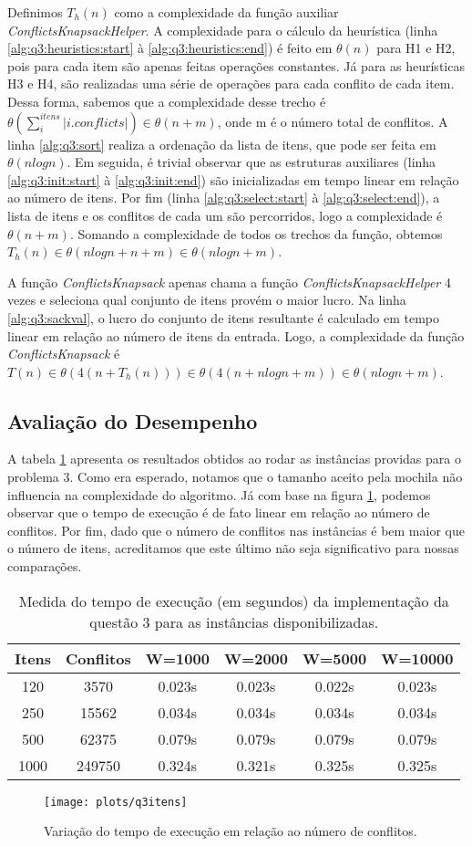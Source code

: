 \documentclass[a4paper, 11pt]{article}
\newcommand{\algsection}[2]{(linha \ref{alg:#1:#2:start} à \ref{alg:#1:#2:end})}
\begin{document}
Definimos $T_h(n)$ como a complexidade da função auxiliar \emph{ConflictsKnapsackHelper}. A complexidade para o cálculo da heurística \algsection{q3}{heuristics} é feito em $\theta(n)$ para H1 e H2, pois para cada item são apenas feitas operações constantes. Já para as heurísticas H3 e H4, são realizadas uma série de operações para cada conflito de cada item. Dessa forma, sabemos que a complexidade desse trecho é $\theta(\sum_{i}^{itens}|i.conflicts|) \in \theta(n + m)$, onde m é o número total de conflitos. A linha \ref{alg:q3:sort} realiza a ordenação da lista de itens, que pode ser feita em $\theta(nlogn)$. Em seguida, é trivial observar que as estruturas auxiliares \algsection{q3}{init} são inicializadas em tempo linear em relação ao número de itens. Por fim \algsection{q3}{select}, a lista de itens e os conflitos de cada um são percorridos, logo a complexidade é $\theta(n + m)$. Somando a complexidade de todos os trechos da função, obtemos $T_h(n) \in \theta(nlogn + n + m) \in \theta(nlogn + m)$.

A função \emph{ConflictsKnapsack} apenas chama a função \emph{ConflictsKnapsackHelper} 4 vezes e seleciona qual conjunto de itens provém o maior lucro. Na linha \ref{alg:q3:sackval}, o lucro do conjunto de itens resultante é calculado em tempo linear em relação ao número de itens da entrada. Logo, a complexidade da função \emph{ConflictsKnapsack} é $T(n) \in \theta(4(n + T_h(n))) \in \theta(4(n + nlogn + m)) \in \theta(nlogn + m)$.

\subsection{Avaliação do Desempenho}

A tabela \ref{tab:q3:bench} apresenta os resultados obtidos ao rodar as instâncias providas para o problema 3.
Como era esperado, notamos que o tamanho aceito pela mochila não influencia na complexidade do algoritmo.
Já com base na figura \ref{fig:q3:itens}, podemos observar que o tempo de execução é de fato linear em relação ao número de conflitos.
Por fim, dado que o número de conflitos nas instâncias é bem maior que o número de itens, acreditamos que este último não seja significativo para nossas comparações.

\begin{table}[htb]
\centering
\begin{tabular}{c|c|c|c|c|c}
Itens & Conflitos & W=1000 & W=2000 & W=5000 & W=10000 \\
\hline
120 & 3570 & 0.023s & 0.023s    & 0.022s    & 0.023s    \\
250 & 15562 & 0.034s    & 0.034s    & 0.034s    & 0.034s    \\
500 & 62375 & 0.079s    & 0.079s    & 0.079s    & 0.079s    \\
1000 & 249750 & 0.324s  & 0.321s    & 0.325s    & 0.325s    \\
\end{tabular}
\caption{Medida do tempo de execução (em segundos) da implementação da questão 3 para as instâncias disponibilizadas.}
\label{tab:q3:bench}
\end{table}

\begin{figure}[htb]
\centering
\texttt{[image: plots/q3itens]}
\caption{Variação do tempo de execução em relação ao número de conflitos.}
\label{fig:q3:itens}
\end{figure}
\end{document}
